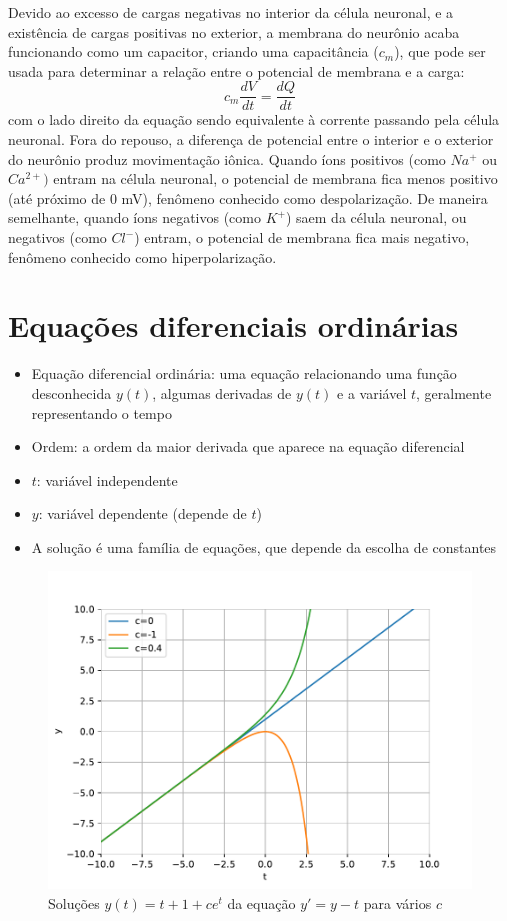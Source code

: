 Devido ao excesso de cargas negativas no interior da célula neuronal, e a existência de cargas positivas no exterior, a membrana do neurônio acaba funcionando como um capacitor, criando uma capacitância ($c_m$), que pode ser usada para determinar a relação entre o potencial de membrana e a carga:
$$
c_m\frac{dV}{dt}=\frac{dQ}{dt}
$$
com o lado direito da equação sendo equivalente à corrente passando pela célula neuronal. Fora do repouso, a diferença de potencial entre o interior e o exterior do neurônio produz movimentação iônica. Quando íons positivos (como $Na^+$ ou $Ca^{2+})$ entram na célula neuronal, o potencial de membrana fica menos positivo (até próximo de 0 mV), fenômeno conhecido como despolarização. De maneira semelhante, quando íons negativos (como $K^+$) saem da célula neuronal, ou negativos (como $Cl^-$) entram, o potencial de membrana fica mais negativo, fenômeno conhecido como hiperpolarização.

\section{Equações diferenciais ordinárias}\label{sec:eqdif}
\begin{itemize}
	\item Equação diferencial ordinária: uma equação relacionando uma função desconhecida $y(t)$, algumas derivadas de $y(t)$ e a variável $t$, geralmente representando o tempo \cite{adkins_ordinary_2012}
	\item Ordem: a ordem da maior derivada que aparece na equação diferencial
	\item $t$: variável independente
	\item $y$: variável dependente (depende de $t$)
	\item A solução é uma família de equações, que depende da escolha de constantes
\end{itemize}

\begin{figure}[htb!]
	\centering
	\caption{Soluções $y(t) = t + 1 + ce^t$ da equação $y'=y-t$ para vários $c$}
	\label{fig:solucao}
	\includegraphics[width=0.7\linewidth]{figs/solucao}
\end{figure}


